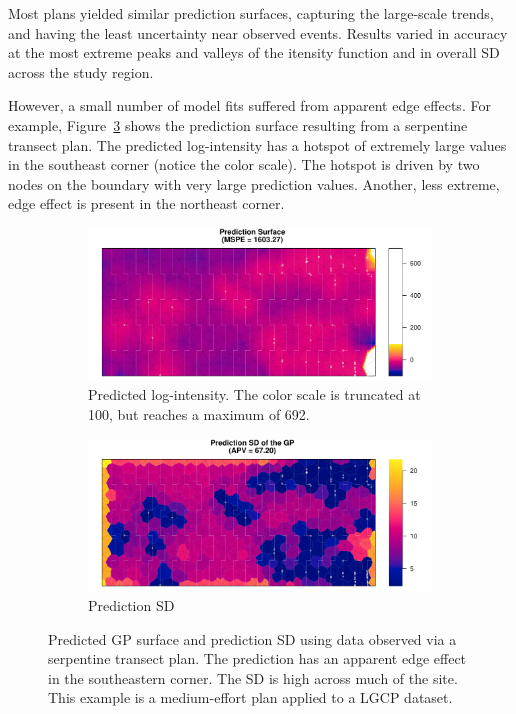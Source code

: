 \documentclass[review]{elsarticle}
\begin{document}
Most plans yielded similar prediction surfaces, capturing the large-scale
trends, and having the least uncertainty near observed events. Results varied
in accuracy at the most extreme peaks and valleys of the itensity function and
in overall SD across the study region.

However, a small number of model fits suffered from apparent edge effects.
For example, Figure~\ref{serp000148} shows the prediction surface resulting
from a serpentine transect plan. The predicted log-intensity has a hotspot of
extremely large values in the southeast corner (notice the color scale). The
hotspot is driven by two nodes on the boundary with very large prediction
values. Another, less extreme, edge effect is present in the northeast corner.

\begin{figure}

\begin{subfigure}{5in}
\includegraphics[width=5in]{../graphics/lambda-Serp000148-LGCP000004.pdf}
\caption{Predicted log-intensity. The color scale is truncated at 100, but
reaches a maximum of 692.}
\label{lambdaserp000148lgcp}
\end{subfigure}

\begin{subfigure}{5in}
\includegraphics[width=5in]{../graphics/lambdaSD-Serp000148-LGCP000004.pdf}
\caption{Prediction SD}
\label{sdserp000148lgcp}
\end{subfigure}

\caption{Predicted GP surface and prediction SD using data observed via a
serpentine transect plan. The prediction has an apparent edge effect in the
southeastern corner. The SD is high across much of the site. This example is
a medium-effort plan applied to a LGCP dataset.}
\label{serp000148}
\end{figure}
\end{document}
